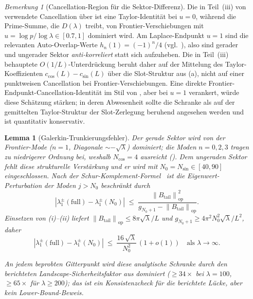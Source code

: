 \documentclass[11pt,a4paper]{article}
\newtheorem{lemma}[lemma]{Lemma}
\theoremstyle{remark}
\newtheorem{remark}[remark]{Bemerkung}
\theoremstyle{plain}
\newcommand{\norm}[1]{\left\lVert #1 \right\rVert}
\begin{document}
\begin{remark}[Cancellation-Region für die Sektor-Differenz]
\label{rem:leading-cancellation-region}
Die in Teil~(iii) von  verwendete Cancellation über  ist eine Taylor-Identität bei $u=0$, während die Prime-Summe, die $D(\lambda)$ treibt, von Frontier-Verschiebungen mit $u=\log p/\log\lambda\in[0.7,1]$ dominiert wird. Am Laplace-Endpunkt $u=1$ sind die relevanten Auto-Overlap-Werte $h_n(1)=(-1)^n/4$ (vgl.\ ), also sind gerader und ungerader Sektor \emph{anti-korreliert} statt sich aufzuheben. Die in Teil~(iii) behauptete $O(1/L)$-Unterdrückung beruht daher auf der Mittelung des Taylor-Koeffizienten $c_{\cos}(L)-c_{\sin}(L)$ über die Slot-Struktur aus (a), nicht auf einer punktweisen Cancellation bei Frontier-Verschiebungen. Eine direkte Frontier-Endpunkt-Cancellation-Identität im Stil von , aber bei $u=1$ verankert, würde diese Schätzung stärken; in deren Abwesenheit sollte die Schranke als auf der gemittelten Taylor-Struktur der Slot-Zerlegung beruhend angesehen werden und ist quantitativ konservativ.
\end{remark}

\begin{lemma}[Galerkin-Trunkierungsfehler]
\label{lem:galerkin}
Der gerade Sektor wird von der Frontier-Mode ($n=1$, Diagonale $\sim-\sqrt\lambda$) dominiert; die Moden $n=0,2,3$ tragen zu niedrigerer Ordnung bei, weshalb $N_{\cos}=4$ ausreicht (). Dem ungeraden Sektor fehlt diese strukturelle Verstärkung und er wird mit $N_0=N_{\sin}\in[40,90]$ eingeschlossen. Nach der Schur-Komplement-Formel~\cite{Kato1966} ist die Eigenwert-Perturbation der Moden $j>N_0$ beschränkt durch
\[
  |\lambda_1^\pm(\mathrm{full})-\lambda_1^\pm(N_0)|
  \;\leq\;
  \frac{\norm{B_{\mathrm{tail}}}_{\mathrm{op}}^2}{g_{N_0+1}-\norm{B_{\mathrm{tail}}}_{\mathrm{op}}}.
\]
Einsetzen von (i)--(ii) liefert $\norm{B_{\mathrm{tail}}}_{\mathrm{op}}\leq 8\pi\sqrt\lambda/L$ und $g_{N_0+1}\geq 4\pi^2 N_0^2\sqrt\lambda/L^2$, daher
\[
  |\lambda_1^\pm(\mathrm{full})-\lambda_1^\pm(N_0)|
  \;\leq\;
  \frac{16\,\sqrt\lambda}{N_0^2}\,(1+o(1))
  \quad\text{als }\lambda\to\infty.
\]
\begin{sloppypar}
An jedem beprobten Gitterpunkt wird diese analytische Schranke durch den berichteten Landscape-Sicher\-heits\-faktor aus  dominiert ($\geq 34\times$ bei $\lambda=100$, $\geq 65\times$ für $\lambda\geq 200$); das ist ein Konsistenzcheck für die berichtete Lücke, aber kein Lower-Bound-Beweis.
\end{sloppypar}
\end{lemma}
\end{document}
